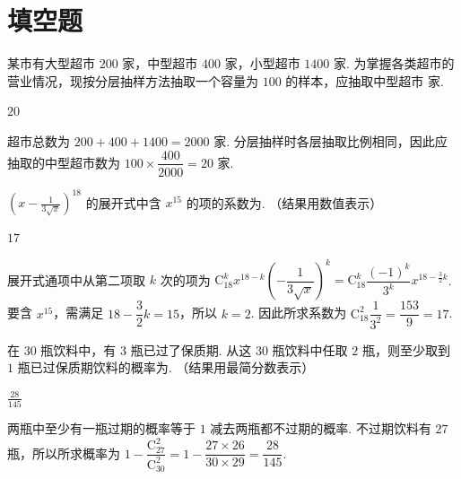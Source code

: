 \section{填空题}

\begin{problem}
某市有大型超市 \(200\text{ 家}\)，中型超市 \(400\text{ 家}\)，小型超市 \(1400\text{ 家}\). 为掌握各类超市的营业情况，现按分层抽样方法抽取一个容量为 \(100\) 的样本，应抽取中型超市\fillinblank{} 家.
\end{problem}

\begin{answer}
\(20\)
\end{answer}

\begin{solution}
超市总数为 \(200+400+1400=2000\) 家. 分层抽样时各层抽取比例相同，因此应抽取的中型超市数为
\(100\times\dfrac{400}{2000}=20\) 家.
\end{solution}

\begin{problem}
\(\left(x - \frac{1}{3\sqrt{x}}\right)^{18}\) 的展开式中含 \(x^{15}\) 的项的系数为\fillinblank{}. （结果用数值表示）
\end{problem}

\begin{answer}
\(17\)
\end{answer}

\begin{solution}
展开式通项中从第二项取 \(k\) 次的项为
\(\mathrm C_{18}^{k}x^{18-k}\left(-\dfrac{1}{3\sqrt{x}}\right)^k=\mathrm C_{18}^{k}\dfrac{(-1)^k}{3^k}x^{18-\frac32k}\). 要含 \(x^{15}\)，需满足
\(18-\dfrac32k=15\)，所以 \(k=2\). 因此所求系数为
\(\mathrm C_{18}^{2}\dfrac{1}{3^2}=\dfrac{153}{9}=17\).
\end{solution}

\begin{problem}
在 \(30\) 瓶饮料中，有 \(3\) 瓶已过了保质期. 从这 \(30\) 瓶饮料中任取 \(2\) 瓶，则至少取到 \(1\) 瓶已过保质期饮料的概率为\fillinblank{}. （结果用最简分数表示）
\end{problem}

\begin{answer}
\(\frac{28}{145}\)
\end{answer}

\begin{solution}
两瓶中至少有一瓶过期的概率等于 \(1\) 减去两瓶都不过期的概率. 不过期饮料有 \(27\) 瓶，所以所求概率为
\(1-\dfrac{\mathrm C_{27}^{2}}{\mathrm C_{30}^{2}}=1-\dfrac{27\times26}{30\times29}=\dfrac{28}{145}\).
\end{solution}

